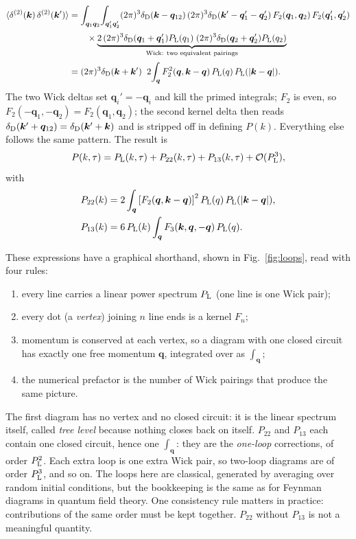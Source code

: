\documentclass[a4paper,11pt]{article}
\newcommand{\vq}{\bm{q}}
\newcommand{\vk}{\bm{k}}
\def\Plin{P_{\rm L}}
\def\dirac{\delta_{\rm D}}
\numberwithin{equation}{section}
\begin{document}
\begin{align}
\langle\delta^{(2)}(\vk)\,\delta^{(2)}(\vk')\rangle
&= \int_{\vq_1\vq_2}\!\int_{\vq_1'\vq_2'}
(2\pi)^3\dirac(\vk-\vq_{12})\,(2\pi)^3\dirac(\vk'-\vq_1'-\vq_2')\,
F_2(\vq_1,\vq_2)\,F_2(\vq_1',\vq_2')
\notag\\[2pt]
&\qquad\times
\underbrace{2\,(2\pi)^3\dirac(\vq_1+\vq_1')\Plin(q_1)\;
(2\pi)^3\dirac(\vq_2+\vq_2')\Plin(q_2)}_{\text{Wick: two equivalent pairings}}
\notag\\[2pt]
&= (2\pi)^3\dirac(\vk+\vk')\;\;
2\!\int_{\vq} F_2^2(\vq,\vk-\vq)\,\Plin(q)\,\Plin(|\vk-\vq|) .
\label{eq:p22_derivation}
\end{align}
The two Wick deltas set $\vq_i' = -\vq_i$ and kill the primed integrals; $F_2$ is even, so $F_2(-\vq_1,-\vq_2) = F_2(\vq_1,\vq_2)$; the second kernel delta then reads $\dirac(\vk'+\vq_{12}) = \dirac(\vk'+\vk)$ and is stripped off in defining $P(k)$. Everything else follows the same pattern. The result is
\begin{equation}
P(k,\tau) = \Plin(k,\tau) + P_{22}(k,\tau) + P_{13}(k,\tau) + \mathcal{O}(\Plin^3) ,
\label{eq:P1loop}
\end{equation}
with
\begin{align}
P_{22}(k) &= 2\int_{\vq} \left[F_2(\vq,\vk-\vq)\right]^2
\Plin(q)\,\Plin(|\vk-\vq|) ,
\label{eq:P22}\\
P_{13}(k) &= 6\,\Plin(k)\int_{\vq} F_3(\vk,\vq,-\vq)\,\Plin(q) .
\label{eq:P13}
\end{align}

These expressions have a graphical shorthand, shown in Fig.~\ref{fig:loops}, read with four rules:
\begin{enumerate}[itemsep=1pt,topsep=2pt]
\item every line carries a linear power spectrum $\Plin$ (one line is one Wick pair);
\item every dot (a \emph{vertex}) joining $n$ line ends is a kernel $F_n$;
\item momentum is conserved at each vertex, so a diagram with one closed circuit has exactly one free momentum $\vq$, integrated over as $\int_{\vq}$;
\item the numerical prefactor is the number of Wick pairings that produce the same picture.
\end{enumerate}
The first diagram has no vertex and no closed circuit: it is the linear spectrum itself, called \emph{tree level} because nothing closes back on itself. $P_{22}$ and $P_{13}$ each contain one closed circuit, hence one $\int_{\vq}$: they are the \emph{one-loop} corrections, of order $\Plin^2$. Each extra loop is one extra Wick pair, so two-loop diagrams are of order $\Plin^3$, and so on. The loops here are classical, generated by averaging over random initial conditions, but the bookkeeping is the same as for Feynman diagrams in quantum field theory. One consistency rule matters in practice: contributions of the same order must be kept together. $P_{22}$ without $P_{13}$ is not a meaningful quantity.
\end{document}
